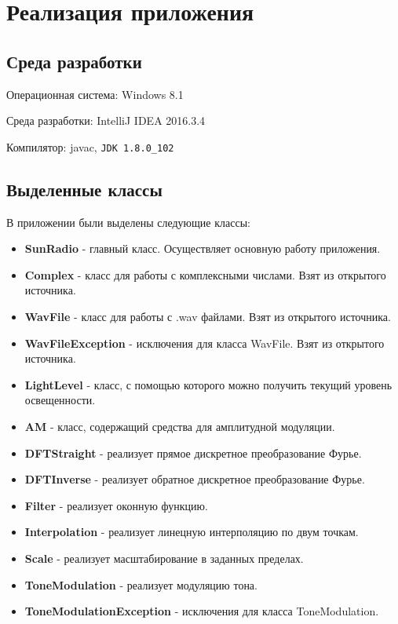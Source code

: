 \documentclass[a4paper]{article}
\begin{document}
\section{Реализация приложения}

\subsection{Среда разработки}

Операционная система: Windows 8.1

Среда разработки: IntelliJ IDEA 2016.3.4

Компилятор: javac, \verb|JDK 1.8.0_102|

\subsection{Выделенные классы}

В приложении были выделены следующие классы:
\begin{itemize}

\item \textbf{SunRadio}  - главный класс. Осуществляет основную работу приложения.

\item \textbf{Complex}  - класс для работы с комплексными числами. Взят из открытого источника.

\item \textbf{WavFile} - класс для работы с .wav файлами. Взят из открытого источника.

\item \textbf{WavFileException} - исключения для класса WavFile. Взят из открытого источника.

\item \textbf{LightLevel} - класс, с помощью которого можно получить текущий уровень освещенности.

\item \textbf{AM} - класс, содержащий средства для амплитудной модуляции. 

\item \textbf{DFTStraight} - реализует прямое дискретное преобразование Фурье. 

\item \textbf{DFTInverse} - реализует обратное дискретное преобразование Фурье. 

\item \textbf{Filter} - реализует оконную функцию.

\item \textbf{Interpolation} - реализует линецную интерполяцию по двум точкам.

\item \textbf{Scale} - реализует масштабирование в заданных пределах.   

\item \textbf{ToneModulation} - реализует модуляцию тона. 

\item \textbf{ToneModulationException} - исключения для класса ToneModulation. 

\end{itemize}
\end{document}

